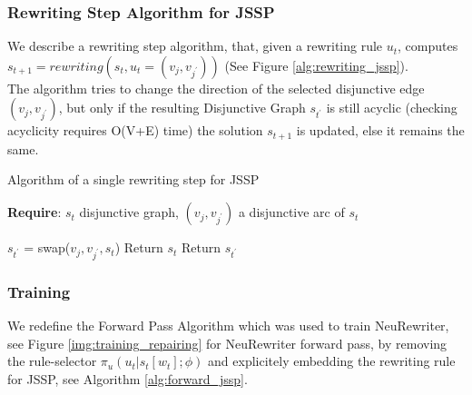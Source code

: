 \documentclass[12pt]{article}
\begin{document}
\subsubsection{Rewriting Step Algorithm for JSSP}
We describe a rewriting step algorithm, that, given a rewriting rule $u_t$, computes $s_{t+1}=rewriting(s_t,u_t=(v_j,v_{j^{'}}))$ (See Figure \ref{alg:rewriting_jssp}).\\
The algorithm tries to change the direction of the selected disjunctive edge $(v_j,v_{j^{'}})$, but only if the resulting Disjunctive Graph $s_{t^{'}}$ is still acyclic (checking acyclicity requires O(V+E) time) 
 the solution $s_{t+1}$ is updated, else it remains the same.\\
\label{alg:rewriting_jssp}
\begin{algorithm}[H]
    \caption{Algorithm of a single rewriting step for JSSP}
    \textbf{Require}: $s_t$ disjunctive graph, $(v_j, v_{j^{'}})$ a disjunctive arc of $s_t$
    \begin{algorithmic}[1]
        \State $s_{t^{'}}$ = swap($v_j, v_{j^{'}},s_t$)    
                           
            \State Return $s_{t}$
        \EndIf
        \State Return $s_{t^{'}}$
    \EndProcedure
    
    \end{algorithmic}
\end{algorithm}

\subsubsection{Training}
We redefine the Forward Pass Algorithm which was used to train NeuRewriter, see Figure \ref{img:training_repairing} for NeuRewriter forward pass, by removing the rule-selector $\pi_u(u_t|s_t[w_t];\phi)$ and explicitely embedding the rewriting rule for JSSP, see Algorithm \ref{alg:forward_jssp}.
\end{document}
